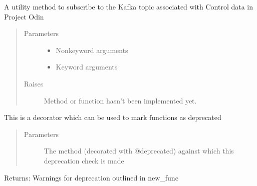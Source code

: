 \documentclass[letterpaper,10pt,english]{sphinxmanual}
\begin{document}
\begin{fulllineitems}
\label{\detokenize{Forge:Forge.ctrl_subscribe}}
\sphinxAtStartPar
A utility method to subscribe to the Kafka topic associated with Control data in Project Odin
\begin{quote}\begin{description}
\item[{Parameters}] \leavevmode\begin{itemize}
\item {} 
\sphinxAtStartPar
{} \textendash{} Non\sphinxhyphen{}keyword arguments

\item {} 
\sphinxAtStartPar
{} \textendash{} Keyword arguments

\end{itemize}

\item[{Raises}] \leavevmode
\sphinxAtStartPar
{} \textendash{} Method or function hasn’t been implemented yet.

\end{description}\end{quote}

\end{fulllineitems}


\begin{fulllineitems}
\label{\detokenize{Forge:Forge.deprecated}}
\sphinxAtStartPar
This is a decorator which can be used to mark functions as deprecated
\begin{quote}\begin{description}
\item[{Parameters}] \leavevmode
\sphinxAtStartPar
{} \textendash{} The method (decorated with @deprecated) against which this deprecation check is made

\end{description}\end{quote}

\sphinxAtStartPar
Returns: Warnings for deprecation outlined in new\_func

\end{fulllineitems}
\end{document}
